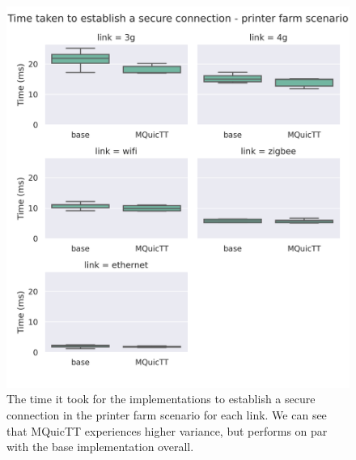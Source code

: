 \begin{figure}
    \centering
    \includegraphics[width=1\linewidth]{images/analysis_connection_time_farm.png}
    \caption{The time it took for the implementations to establish a secure connection in the printer farm scenario for each link.
        We can see that MQuicTT experiences higher variance, but performs on par with the base implementation overall.}
    \label{fig:connect_time_farm}
\end{figure}

